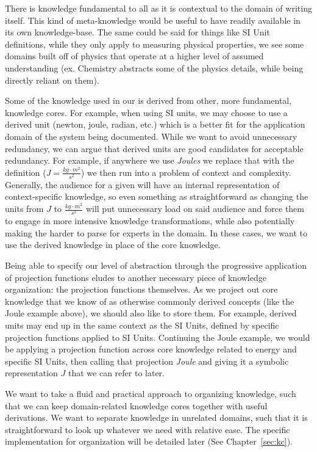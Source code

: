 There is knowledge fundamental to all \sfs{} as it is contextual to the domain 
of \sf{} writing itself. This kind of meta-knowledge would be useful to have 
readily available in its own knowledge-base. The same could be said for things 
like SI Unit definitions, while they only apply to measuring physical 
properties, we see some domains built off of physics that operate at a higher 
level of assumed understanding (ex. Chemistry abstracts some of the physics 
details, while being directly reliant on them).

Some of the knowledge used in our \sfs{} is derived from other, more 
fundamental, knowledge cores. For example, when using SI units, we may choose 
to use a derived unit (newton, joule, radian, etc.) which 
is a better fit for the application domain of the system being documented. 
While we want to avoid unnecessary redundancy, we can argue that derived units 
are good candidates for acceptable redundancy. For example, if anywhere we use 
\emph{Joules} we replace that with the definition ($J = 
\frac{kg\cdot{}m^2}{s^2}$) we then run into a problem of context and 
complexity. Generally, the audience for a given \sf{} will have an internal 
representation of context-specific knowledge, so even something as 
straightforward as changing the units from $J$ to $\frac{kg\cdot{}m^2}{s^2}$ 
will put unnecessary load on said audience and force them to engage in more 
intensive knowledge transformations, while also potentially making the \sfs{} 
harder to parse for experts in the domain. In these cases, we want to use the 
derived knowledge in place of the core knowledge.

Being able to specify our level of abstraction through the progressive 
application of projection functions eludes to another necessary piece of 
knowledge organization: the projection functions themselves. As we project out 
core knowledge that we know of as otherwise commonly derived concepts (like the 
Joule example above), we should also like to store them. For example, derived 
units may end up in the same context as the SI Units, defined by specific 
projection functions applied to SI Units. Continuing the Joule example, we 
would be applying a projection function across core knowledge related to energy 
and specific SI Units, then calling that projection \emph{Joule} and giving it 
a symbolic representation $J$ that we can refer to later.

We want to take a fluid and practical approach to organizing knowledge, such 
that we can keep domain-related knowledge cores together with useful 
derivations. We want to separate knowledge in unrelated domains, such that it 
is straightforward to look up whatever we need with relative ease. The 
specific implementation for organization will be detailed later (See 
Chapter~\ref{sec:kc}).

